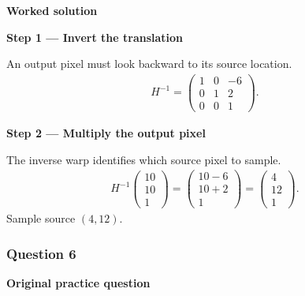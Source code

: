 \documentclass[letterpaper,11pt,english,openany,oneside]{jupyterBook}
\begin{document}
\par\medskip
\textbf{Worked solution}\par\smallskip

\par\medskip{}
{\color{QuizStepRed}\bfseries Step 1 — Invert the translation}\par\smallskip

\sphinxAtStartPar
{} An output pixel must look backward to its source location.
{\color{QuizMathBlue} \begin{equation*}
\begin{split}
H^{-1}=\begin{pmatrix}1&0&-6\\0&1&2\\0&0&1\end{pmatrix}.
\end{split}
\end{equation*}}
\par

\par\medskip{}
{\color{QuizStepRed}\bfseries Step 2 — Multiply the output pixel}\par\smallskip

\sphinxAtStartPar
{} The inverse warp identifies which source pixel to sample.
{\color{QuizMathBlue} \begin{equation*}
\begin{split}
H^{-1}\begin{pmatrix}10\\10\\1\end{pmatrix}=\begin{pmatrix}10-6\\10+2\\1\end{pmatrix}=\begin{pmatrix}4\\12\\1\end{pmatrix}.
\end{split}
\end{equation*}}
\sphinxAtStartPar
Sample source {\color{QuizMathBlue} \((4,12)\)}.

\par

\par\medskip


\subsubsection{Question 6}
\label{\detokenize{lectures/lecture02/tldr:question-6}}\label{\detokenize{lectures/lecture02/tldr:lec02-tldr-q6}}
\par\medskip\textbf{Original practice question}\par\smallskip
\end{document}
